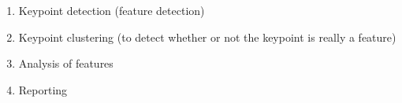 \documentclass{article}
\begin{document}
\begin{enumerate}
\begin{enumerate}
		\begin{enumerate}
	    	\item Keypoint detection (feature detection)
	    	\item Keypoint clustering (to detect whether or not the keypoint is really
	    	a feature)
	    	\item Analysis of features
	    	\item Reporting
		\end{enumerate}
	\end{enumerate}
\end{enumerate}
\pagebreak

\label{Programming Problem (Seam Carving)}
\end{document}
